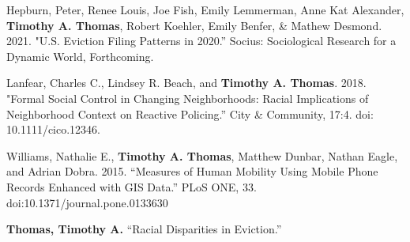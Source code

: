 

\begin{cvparagraph}

Hepburn, Peter, Renee Louis, Joe Fish, Emily Lemmerman, Anne Kat Alexander,  \textbf{Timothy A. Thomas}, Robert Koehler, Emily Benfer, \& Mathew Desmond. 2021. "U.S. Eviction Filing Patterns in 2020.” Socius: Sociological Research for a Dynamic World, Forthcoming.
\end{cvparagraph}

\begin{cvparagraph}

Lanfear, Charles C., Lindsey R. Beach, and \textbf{Timothy A. Thomas}. 2018. "Formal Social Control in Changing Neighborhoods: Racial Implications of Neighborhood Context on Reactive Policing.” City \& Community, 17:4. doi: 10.1111/cico.12346.
\end{cvparagraph}

\begin{cvparagraph}

Williams, Nathalie E., \textbf{Timothy A. Thomas}, Matthew Dunbar, Nathan Eagle, and Adrian Dobra. 2015. “Measures of Human Mobility Using Mobile Phone Records Enhanced
with GIS Data.” PLoS ONE, 33. doi:10.1371/journal.pone.0133630
\end{cvparagraph}


\begin{cvparagraph}

\textbf{Thomas, Timothy A.} “Racial Disparities in Eviction.”
\end{cvparagraph}

